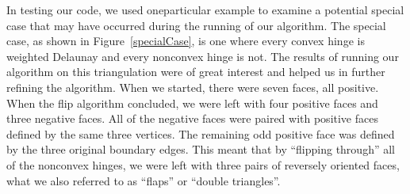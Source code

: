 \documentclass[12pt]{article}
\begin{document}
 In testing our code, we used oneparticular example to examine a potential special case that may have occurred during the running of our algorithm. The special case, as shown in Figure~\ref{specialCase}, is one where every convex hinge is weighted Delaunay and every nonconvex hinge is not. The results of running our algorithm on this triangulation were of great interest and helped us in further refining the algorithm. When we started, there were seven faces, all positive. When the flip algorithm concluded, we were left with four positive faces and three negative faces. All of the negative faces were paired with positive faces defined by the same three vertices. The remaining odd positive face was defined by the three original boundary edges. This meant that by ``flipping through'' all of the nonconvex hinges, we were left with three pairs of reversely oriented faces, what we also referred to as ``flaps'' or ``double triangles''.
\end{document}
